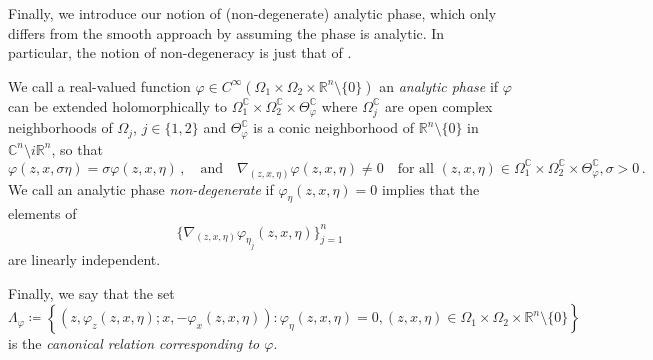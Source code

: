 \documentclass[
	fontsize=11pt, 
	twoside=false, 
	abstract=true, 
	a4paper,
]{scrartcl}
\newcommand{\eps}{\varepsilon}
\newcommand{\sem}{\setminus\{0\}}
\newcommand{\RR}{\mathbb{R}}
\newcommand{\CC}{\mathbb{C}}
\newcommand{\abs}[1]{\left\lvert#1\right\rvert}
\newcommand{\del}{\partial}
\newcommand{\an}{\quad\text{and}\quad}
\begin{document}
%

Finally, we introduce our notion of (non-degenerate) analytic phase, which only differs from the smooth approach by assuming the phase is analytic. In particular, the notion of non-degeneracy is just that of \cite{FIO1}. 

\begin{definition}\label{def:phase}
	We call a real-valued function $\varphi \in C^\infty(\Omega_1\times \Omega_2 \times \RR^n\sem)$ an \emph{analytic phase} if $\varphi$ can be extended holomorphically to $\Omega_1^{\CC}\times \Omega_2^{\CC}\times \Theta^{\CC}_\varphi$ where $\Omega_j^{\CC}$ are open complex neighborhoods of $\Omega_j$, $j\in\{1,2\}$ and $\Theta^{\CC}_\varphi$ is a conic neighborhood of $\RR^n\sem$ in $\CC^n\setminus i\RR^n$, so that 
\[
	\varphi(z,x,\sigma\eta) = \sigma\varphi(z,x,\eta)\,,\an \nabla_{(z,x,\eta)}\varphi(z,x,\eta) \neq 0\quad\text{for all } (z,x,\eta) \in \Omega_1^{\CC}\times\Omega_2^{\CC}\times \Theta^{\CC}_\varphi, \sigma > 0\,.
\]
	We call an analytic phase \emph{non-degenerate} if $\varphi_\eta(z,x,\eta) =0$ implies that the elements of 
	\[
		\{\nabla_{(z,x,\eta)} \varphi_{\eta_j}(z,x,\eta)\}_{j=1}^{n}
	\]
	are linearly independent.

	Finally, we say that the set %
	\[
		\Lambda_\varphi \coloneqq \left\{(z,\varphi_z(z,x,\eta); x,-\varphi_x(z,x,\eta))\colon \varphi_\eta(z,x,\eta) = 0, (z,x,\eta)\in \Omega_1\times\Omega_2\times\RR^n\sem\right\}
	\]
	is the \emph{canonical relation corresponding to $\varphi$}. 
\end{definition}
\end{document}
